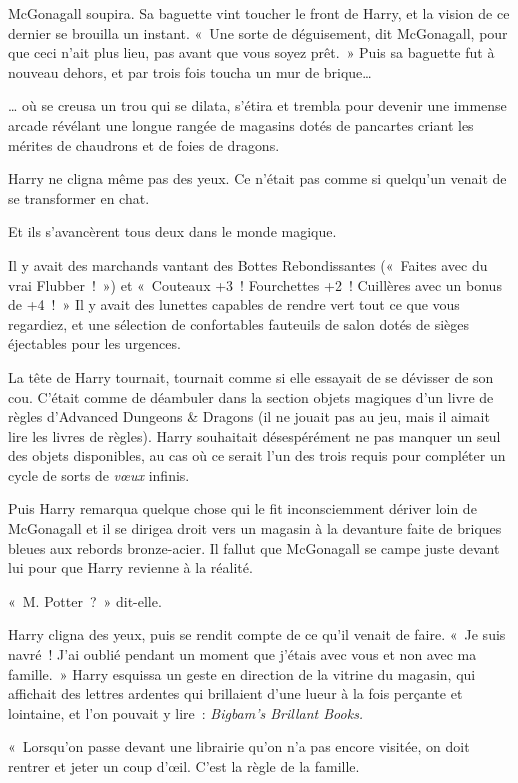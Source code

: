 McGonagall soupira. Sa baguette vint toucher le front de Harry, et la vision de ce dernier se brouilla un instant. «~Une sorte de déguisement, dit McGonagall, pour que ceci n'ait plus lieu, pas avant que vous soyez prêt.~» Puis sa baguette fut à nouveau dehors, et par trois fois toucha un mur de brique…

… où se creusa un trou qui se dilata, s'étira et trembla pour devenir une immense arcade révélant une longue rangée de magasins dotés de pancartes criant les mérites de chaudrons et de foies de dragons.

Harry ne cligna même pas des yeux. Ce n'était pas comme si quelqu'un venait de se transformer en chat.

Et ils s'avancèrent tous deux dans le monde magique.

Il y avait des marchands vantant des Bottes Rebondissantes («~Faites avec du vrai Flubber~!~») et «~Couteaux +3~! Fourchettes +2~! Cuillères avec un bonus de +4~!~» Il y avait des lunettes capables de rendre vert tout ce que vous regardiez, et une sélection de confortables fauteuils de salon dotés de sièges éjectables pour les urgences.

La tête de Harry tournait, tournait comme si elle essayait de se dévisser de son cou. C'était comme de déambuler dans la section objets magiques d'un livre de règles d'Advanced Dungeons \& Dragons (il ne jouait pas au jeu, mais il aimait lire les livres de règles). Harry souhaitait désespérément ne pas manquer un seul des objets disponibles, au cas où ce serait l'un des trois requis pour compléter un cycle de sorts de \emph{vœux} infinis.

Puis Harry remarqua quelque chose qui le fit inconsciemment dériver loin de McGonagall et il se dirigea droit vers un magasin à la devanture faite de briques bleues aux rebords bronze-acier. Il fallut que McGonagall se campe juste devant lui pour que Harry revienne à la réalité.

«~M. Potter~?~» dit-elle.

Harry cligna des yeux, puis se rendit compte de ce qu'il venait de faire. «~Je suis navré~! J'ai oublié pendant un moment que j'étais avec vous et non avec ma famille.~» Harry esquissa un geste en direction de la vitrine du magasin, qui affichait des lettres ardentes qui brillaient d'une lueur à la fois perçante et lointaine, et l'on pouvait y lire~: \emph{Bigbam's Brillant Books.}

«~Lorsqu'on passe devant une librairie qu'on n'a pas encore visitée, on doit rentrer et jeter un coup d'œil. C'est la règle de la famille.

